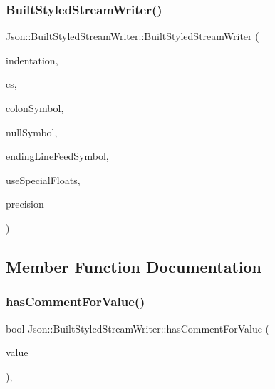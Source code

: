 \subsubsection{\texorpdfstring{Built\+Styled\+Stream\+Writer()}{BuiltStyledStreamWriter()}}
{\footnotesize\ttfamily Json\+::\+Built\+Styled\+Stream\+Writer\+::\+Built\+Styled\+Stream\+Writer (\begin{DoxyParamCaption}\item[{\hyperlink{json_8h_a1e723f95759de062585bc4a8fd3fa4be_a1e723f95759de062585bc4a8fd3fa4be}{J\+S\+O\+N\+C\+P\+P\+\_\+\+S\+T\+R\+I\+NG} const \&}]{indentation,  }\item[{\hyperlink{structJson_1_1CommentStyle_a51fc08f3518fd81eba12f340d19a3d0c_a51fc08f3518fd81eba12f340d19a3d0c}{Comment\+Style\+::\+Enum}}]{cs,  }\item[{\hyperlink{json_8h_a1e723f95759de062585bc4a8fd3fa4be_a1e723f95759de062585bc4a8fd3fa4be}{J\+S\+O\+N\+C\+P\+P\+\_\+\+S\+T\+R\+I\+NG} const \&}]{colon\+Symbol,  }\item[{\hyperlink{json_8h_a1e723f95759de062585bc4a8fd3fa4be_a1e723f95759de062585bc4a8fd3fa4be}{J\+S\+O\+N\+C\+P\+P\+\_\+\+S\+T\+R\+I\+NG} const \&}]{null\+Symbol,  }\item[{\hyperlink{json_8h_a1e723f95759de062585bc4a8fd3fa4be_a1e723f95759de062585bc4a8fd3fa4be}{J\+S\+O\+N\+C\+P\+P\+\_\+\+S\+T\+R\+I\+NG} const \&}]{ending\+Line\+Feed\+Symbol,  }\item[{bool}]{use\+Special\+Floats,  }\item[{unsigned int}]{precision }\end{DoxyParamCaption})}



\subsection{Member Function Documentation}
\mbox{\label{structJson_1_1BuiltStyledStreamWriter_a457c2f3c1e8c952caeb60e52477d0c9a_a457c2f3c1e8c952caeb60e52477d0c9a}} 
\subsubsection{\texorpdfstring{has\+Comment\+For\+Value()}{hasCommentForValue()}}
{\footnotesize\ttfamily bool Json\+::\+Built\+Styled\+Stream\+Writer\+::has\+Comment\+For\+Value (\begin{DoxyParamCaption}\item[{const \hyperlink{classJson_1_1Value}{Value} \&}]{value }\end{DoxyParamCaption})\hspace{0.3cm}{\ttfamily [static]}, {\ttfamily [private]}}



